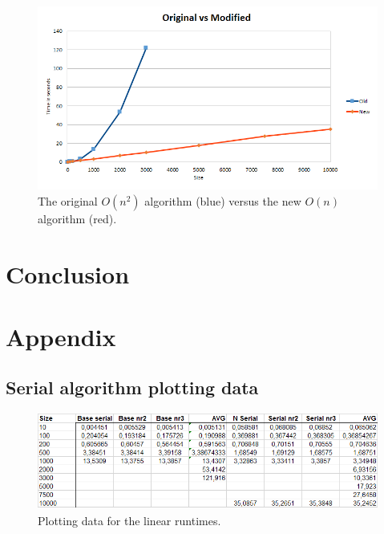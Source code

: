 \documentclass[a4paper,11pt,oneside]{book}
\begin{document}
\begin{figure}[H]
  \centering
  \begin{minipage}[b]{0.9\textwidth}
    \includegraphics[width=\textwidth]{graph_regular.png}
    \caption{The original $O(n^{2})$ algorithm (blue) versus the new $O(n)$ algorithm (red).}
  \end{minipage}
\end{figure}



\chapter{Conclusion}


\newpage
{}
\chapter{Appendix}
\section{Serial algorithm plotting data}

\begin{figure}[H]
  \centering
  \begin{minipage}[b]{0.9\textwidth}
    \includegraphics[width=\textwidth]{plotdata.png}
    \caption{Plotting data for the linear runtimes.}
  \end{minipage}
\end{figure}
\end{document}
